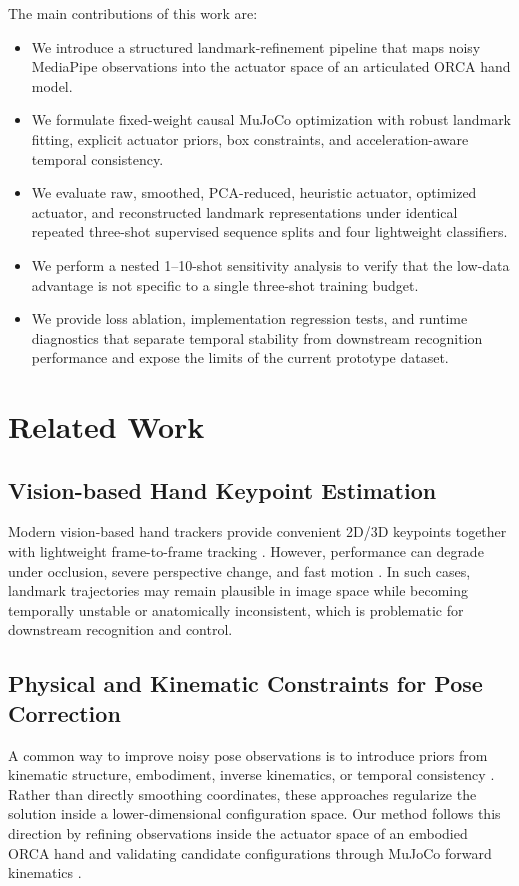 \documentclass[11pt]{article}
\begin{document}
The main contributions of this work are:
\begin{itemize}[leftmargin=*]
    \item We introduce a structured landmark-refinement pipeline that maps noisy MediaPipe observations into the actuator space of an articulated ORCA hand model.
    \item We formulate fixed-weight causal MuJoCo optimization with robust landmark fitting, explicit actuator priors, box constraints, and acceleration-aware temporal consistency.
    \item We evaluate raw, smoothed, PCA-reduced, heuristic actuator, optimized actuator, and reconstructed landmark representations under identical repeated three-shot supervised sequence splits and four lightweight classifiers.
    \item We perform a nested 1--10-shot sensitivity analysis to verify that the low-data advantage is not specific to a single three-shot training budget.
    \item We provide loss ablation, implementation regression tests, and runtime diagnostics that separate temporal stability from downstream recognition performance and expose the limits of the current prototype dataset.
\end{itemize}

\section{Related Work}
\subsection{Vision-based Hand Keypoint Estimation}
Modern vision-based hand trackers provide convenient 2D/3D keypoints together with lightweight frame-to-frame tracking \cite{zhang2020mediapipehands,zimmermann2017learning}. However, performance can degrade under occlusion, severe perspective change, and fast motion \cite{boukhayma2019handwild}. In such cases, landmark trajectories may remain plausible in image space while becoming temporally unstable or anatomically inconsistent, which is problematic for downstream recognition and control.

\subsection{Physical and Kinematic Constraints for Pose Correction}
A common way to improve noisy pose observations is to introduce priors from kinematic structure, embodiment, inverse kinematics, or temporal consistency \cite{romero2017embodied,taylor2016efficient}. Rather than directly smoothing coordinates, these approaches regularize the solution inside a lower-dimensional configuration space. Our method follows this direction by refining observations inside the actuator space of an embodied ORCA hand and validating candidate configurations through MuJoCo forward kinematics \cite{todorov2012mujoco}.
\end{document}
